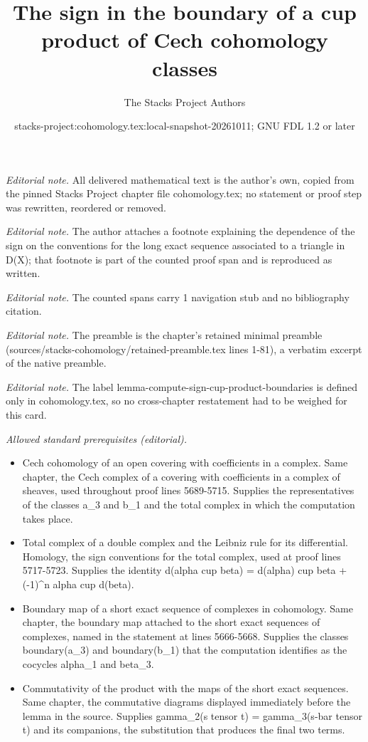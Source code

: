 \documentclass[10pt,a4paper]{amsart}
\title{The sign in the boundary of a cup product of Cech cohomology classes}
\author{The Stacks Project Authors}
\date{stacks-project:cohomology.tex:local-snapshot-20261011; GNU FDL 1.2 or later}
\theoremstyle{plain}
\theoremstyle{definition}
\theoremstyle{remark}
\numberwithin{equation}{subsection}
\begin{document}
\maketitle
\noindent\textit{Editorial note.} All delivered mathematical text is the author's own, copied from the pinned Stacks Project chapter file cohomology.tex; no statement or proof step was rewritten, reordered or removed.\par\medskip
\noindent\textit{Editorial note.} The author attaches a footnote explaining the dependence of the sign on the conventions for the long exact sequence associated to a triangle in D(X); that footnote is part of the counted proof span and is reproduced as written.\par\medskip
\noindent\textit{Editorial note.} The counted spans carry 1 navigation stub and no bibliography citation.\par\medskip
\noindent\textit{Editorial note.} The preamble is the chapter's retained minimal preamble (sources/stacks-cohomology/retained-preamble.tex lines 1-81), a verbatim excerpt of the native preamble.\par\medskip
\noindent\textit{Editorial note.} The label lemma-compute-sign-cup-product-boundaries is defined only in cohomology.tex, so no cross-chapter restatement had to be weighed for this card.\par\medskip
\noindent\textit{Allowed standard prerequisites (editorial).}\begin{itemize}
\item Cech cohomology of an open covering with coefficients in a complex. Same chapter, the Cech complex of a covering with coefficients in a complex of sheaves, used throughout proof lines 5689-5715. Supplies the representatives of the classes a\_3 and b\_1 and the total complex in which the computation takes place.
\item Total complex of a double complex and the Leibniz rule for its differential. Homology, the sign conventions for the total complex, used at proof lines 5717-5723. Supplies the identity d(alpha cup beta) = d(alpha) cup beta + (-1)\textasciicircum{}n alpha cup d(beta).
\item Boundary map of a short exact sequence of complexes in cohomology. Same chapter, the boundary map attached to the short exact sequences of complexes, named in the statement at lines 5666-5668. Supplies the classes boundary(a\_3) and boundary(b\_1) that the computation identifies as the cocycles alpha\_1 and beta\_3.
\item Commutativity of the product with the maps of the short exact sequences. Same chapter, the commutative diagrams displayed immediately before the lemma in the source. Supplies gamma\_2(s tensor t) = gamma\_3(s-bar tensor t) and its companions, the substitution that produces the final two terms.
\end{itemize}\medskip
\end{document}
